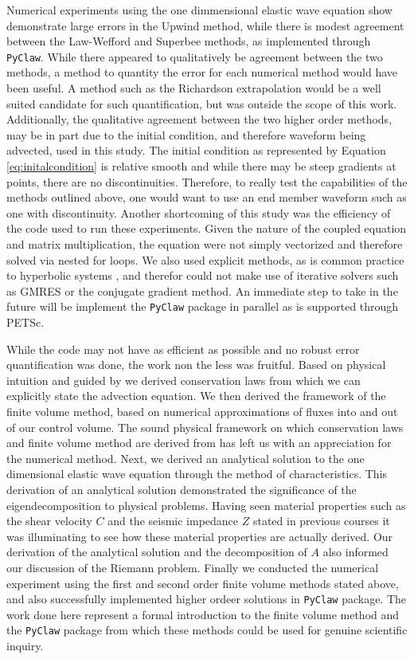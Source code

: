 \documentclass[review,onefignum,onetabnum]{siamart171218}
\begin{document}
Numerical experiments using the one dimmensional elastic wave equation show demonstrate large errors in the Upwind method, while there is modest agreement between the Law-Wefford and Superbee methods, as implemented through \texttt{PyClaw}. While there appeared to qualitatively be agreement between the two methods, a method to quantity the error for each numerical method would have been useful. A method such as the Richardson extrapolation would be a well suited candidate for such quantification, but was outside the scope of this work. Additionally, the qualitative agreement between the two higher order methods, may be in part due to the initial condition, and therefore waveform being advected, used in this study. The initial condition as represented by Equation \ref{eq:initalcondition} is relative smooth and while there may be steep gradients at points, there are no discontinuities. Therefore, to really test the capabilities of the methods outlined above, one would want to use an end member waveform such as one with discontinuity. Another shortcoming of this study was the efficiency of the code used to run these experiments. Given the nature of the coupled equation and matrix multiplication, the equation were not simply vectorized and therefore solved via nested for loops. We also used explicit methods, as is common practice to hyperbolic systems \cite{leveque_2002}, and therefor could not make use of iterative solvers such as GMRES or the conjugate gradient method. An immediate step to take in the future will be implement the \texttt{PyClaw} package in parallel as is supported through PETSc.

While the code may not have as efficient as possible and no robust error quantification was done, the work non the less was fruitful. Based on physical intuition and guided by \cite{leveque_2002} we derived conservation laws from which we can explicitly state the advection equation. We then derived the framework of the finite volume method, based on numerical approximations of fluxes into and out of our control volume. The sound physical framework on which conservation laws and finite volume method are derived from has left us with an appreciation for the numerical method. Next, we derived an analytical solution to the one dimensional elastic wave equation through the method of characteristics. This derivation of an analytical solution demonstrated the significance of the eigendecomposition to physical problems. Having seen material properties such as the shear velocity $C$ and the seismic impedance $Z$ stated in previous courses it was illuminating to see how these material properties are actually derived. Our derivation of the analytical solution and the decomposition of $A$ also informed our discussion of the Riemann problem. Finally we conducted the numerical experiment using the first and second order finite volume methods stated above, and also successfully implemented higher ordeer solutions in \texttt{PyClaw} package. The work done here represent a formal introduction to the finite volume method and the \texttt{PyClaw} package from which these methods could be used for genuine scientific inquiry. 
\end{document}
